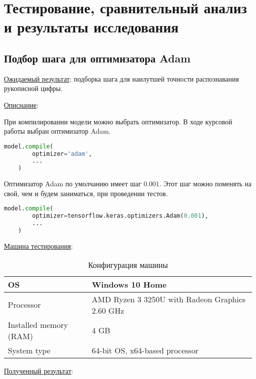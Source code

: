 \section{Тестирование, сравнительный анализ и результаты исследования}

\subsection{Подбор шага для оптимизатора Adam}

\underline{Ожидаемый результат}:
подборка шага для наилутшей точности распознавания рукописной цифры.

\underline{Описнание}:

При компилировании модели можно выбрать оптимизатор. В ходе курсовой работы выбран оптимизатор Adam.

\begin{lstlisting}[language=Python]
    model.compile(
        optimizer='adam',
        ...
    )
\end{lstlisting}

Оптимизатор Adam по умолчанию имеет шаг $0.001$. Этот шаг можно поменять на свой, чем и будем заниматься, при проведении тестов.

\begin{lstlisting}[language=Python]
    model.compile(
        optimizer=tensorflow.keras.optimizers.Adam(0.001),
        ...
    )
\end{lstlisting}

\underline{Машина тестирования}:

\begin{table}[htbp]
    \centering
    \caption{Конфигурация машины}
    \label{tab:5_adam_step_machine}
    \begin{tabular}{|l|l|}
        \hline
        OS                      & Windows 10 Home                                   \\  \hline
        Processor               & AMD Ryzen 3 3250U with Radeon Graphics 2.60 GHz   \\  \hline
        Installed memory (RAM)  & 4 GB                                              \\  \hline
        System type             & 64-bit OS, x64-based processor                    \\  \hline
    \end{tabular}
\end{table}

\underline{Полученный результат}:

